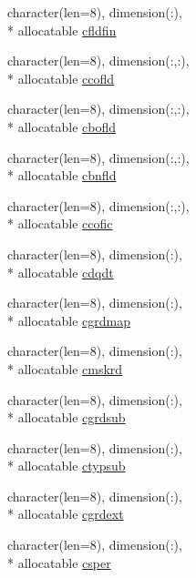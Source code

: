 \begin{DoxyCompactItemize}
\item 
character(len=8), dimension(\+:), \\*
allocatable \hyperlink{classmod__oasis__namcouple_aa387fcfde8c2538e22897b243ff5024c}{cfldfin}
\item 
character(len=8), dimension(\+:,\+:), \\*
allocatable \hyperlink{classmod__oasis__namcouple_af8d81a53bd28ddf6bfe19f5e05f1d867}{ccofld}
\item 
character(len=8), dimension(\+:,\+:), \\*
allocatable \hyperlink{classmod__oasis__namcouple_ab0f93bb917e445dc4e55fc2326168a42}{cbofld}
\item 
character(len=8), dimension(\+:,\+:), \\*
allocatable \hyperlink{classmod__oasis__namcouple_af5bfb0fe58a77461130b9967fa7a4d5e}{cbnfld}
\item 
character(len=8), dimension(\+:,\+:), \\*
allocatable \hyperlink{classmod__oasis__namcouple_a009543dda4495ab9b5ac3fcf15767682}{ccofic}
\item 
character(len=8), dimension(\+:), \\*
allocatable \hyperlink{classmod__oasis__namcouple_a9c5a3b3a864f3feb95eddc08616b998e}{cdqdt}
\item 
character(len=8), dimension(\+:), \\*
allocatable \hyperlink{classmod__oasis__namcouple_affa01947af89e5cdad5f33fba2a53d22}{cgrdmap}
\item 
character(len=8), dimension(\+:), \\*
allocatable \hyperlink{classmod__oasis__namcouple_a28c3f9e076a686c8ef916221e8fe4e10}{cmskrd}
\item 
character(len=8), dimension(\+:), \\*
allocatable \hyperlink{classmod__oasis__namcouple_ac7f3cff3406912fe6e48c3cc7cf5436b}{cgrdsub}
\item 
character(len=8), dimension(\+:), \\*
allocatable \hyperlink{classmod__oasis__namcouple_ad8f8aca3a6fa885e4edf027b79a93305}{ctypsub}
\item 
character(len=8), dimension(\+:), \\*
allocatable \hyperlink{classmod__oasis__namcouple_a5db101d0bffaf6fbd5ae10d1d0069108}{cgrdext}
\item 
character(len=8), dimension(\+:), \\*
allocatable \hyperlink{classmod__oasis__namcouple_a348612422a03e478041ca5bdfd7201ae}{csper}

\end{DoxyCompactItemize}
